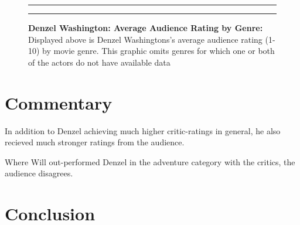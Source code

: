 \documentclass[]{article}
\begin{document}
\begin{figure}[!ht]
 \label{fig:one-graphic}
    \begin{center}
    \end{center}
    \hrule
      \vspace{2mm}
    \caption{ \textbf{Denzel Washington: Average Audience Rating by Genre:} \newline \footnotesize{ Displayed above is Denzel Washingtons's average audience rating (1-10) by movie genre. This graphic omits genres for which one or both of the actors do not have available data}  }
    \vspace{2mm}
    \hrule
\end{figure}

\section{Commentary}
\label{sec:commentary}
\doublespacing

\noindent In addition to Denzel achieving much higher critic-ratings in
general, he also recieved much stronger ratings from the audience.
\newline

\noindent Where Will out-performed Denzel in the adventure category with
the critics, the audience disagrees.\newline

\section{Conclusion}
\label{sec:conclusion}
\end{document}
